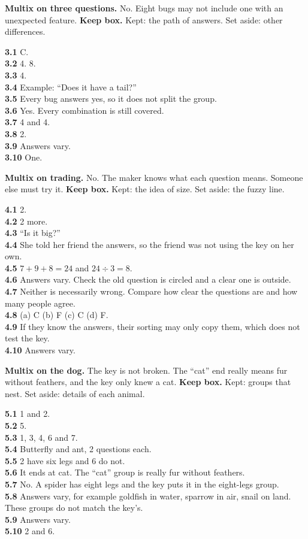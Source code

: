 \textbf{Multix on three questions.} No. Eight bugs may not include one with an unexpected feature. \textbf{Keep box.} Kept: the path of answers. Set aside: other differences.

\textbf{3.1} C.\\
\textbf{3.2} 4. 8.\\
\textbf{3.3} 4.\\
\textbf{3.4} Example: ``Does it have a tail?''\\
\textbf{3.5} Every bug answers yes, so it does not split the group.\\
\textbf{3.6} Yes. Every combination is still covered.\\
\textbf{3.7} 4 and 4.\\
\textbf{3.8} 2.\\
\textbf{3.9} Answers vary.\\
\textbf{3.10} One.

\textbf{Multix on trading.} No. The maker knows what each question means. Someone else must try it. \textbf{Keep box.} Kept: the idea of size. Set aside: the fuzzy line.

\textbf{4.1} 2.\\
\textbf{4.2} 2 more.\\
\textbf{4.3} ``Is it big?''\\
\textbf{4.4} She told her friend the answers, so the friend was not using the key on her own.\\
\textbf{4.5} $7+9+8=24$ and $24\div3=8$.\\
\textbf{4.6} Answers vary. Check the old question is circled and a clear one is outside.\\
\textbf{4.7} Neither is necessarily wrong. Compare how clear the questions are and how many people agree.\\
\textbf{4.8} (a) C (b) F (c) C (d) F.\\
\textbf{4.9} If they know the answers, their sorting may only copy them, which does not test the key.\\
\textbf{4.10} Answers vary.

\textbf{Multix on the dog.} The key is not broken. The ``cat'' end really means fur without feathers, and the key only knew a cat. \textbf{Keep box.} Kept: groups that nest. Set aside: details of each animal.

\textbf{5.1} 1 and 2.\\
\textbf{5.2} 5.\\
\textbf{5.3} 1, 3, 4, 6 and 7.\\
\textbf{5.4} Butterfly and ant, 2 questions each.\\
\textbf{5.5} 2 have six legs and 6 do not.\\
\textbf{5.6} It ends at cat. The ``cat'' group is really fur without feathers.\\
\textbf{5.7} No. A spider has eight legs and the key puts it in the eight-legs group.\\
\textbf{5.8} Answers vary, for example goldfish in water, sparrow in air, snail on land. These groups do not match the key's.\\
\textbf{5.9} Answers vary.\\
\textbf{5.10} 2 and 6.

